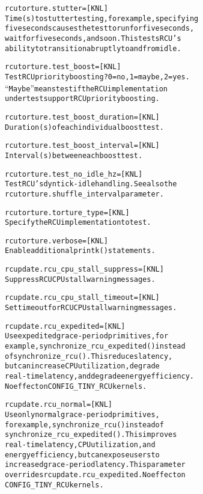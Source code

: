 \documentclass[a4paper,8pt,english]{sphinxmanual}
\begin{document}
\begin{alltt}
        rcutorture.stutter= {[}KNL{]}
                        Time (s) to stutter testing, for example, specifying
                        five seconds causes the test to run for five seconds,
                        wait for five seconds, and so on.  This tests RCU's
                        ability to transition abruptly to and from idle.

        rcutorture.test\_boost= {[}KNL{]}
                        Test RCU priority boosting?  0=no, 1=maybe, 2=yes.
                        ``Maybe'' means test if the RCU implementation
                        under test support RCU priority boosting.

        rcutorture.test\_boost\_duration= {[}KNL{]}
                        Duration (s) of each individual boost test.

        rcutorture.test\_boost\_interval= {[}KNL{]}
                        Interval (s) between each boost test.

        rcutorture.test\_no\_idle\_hz= {[}KNL{]}
                        Test RCU's dyntick-idle handling.  See also the
                        rcutorture.shuffle\_interval parameter.

        rcutorture.torture\_type= {[}KNL{]}
                        Specify the RCU implementation to test.

        rcutorture.verbose= {[}KNL{]}
                        Enable additional printk() statements.

        rcupdate.rcu\_cpu\_stall\_suppress= {[}KNL{]}
                        Suppress RCU CPU stall warning messages.

        rcupdate.rcu\_cpu\_stall\_timeout= {[}KNL{]}
                        Set timeout for RCU CPU stall warning messages.

        rcupdate.rcu\_expedited= {[}KNL{]}
                        Use expedited grace-period primitives, for
                        example, synchronize\_rcu\_expedited() instead
                        of synchronize\_rcu().  This reduces latency,
                        but can increase CPU utilization, degrade
                        real-time latency, and degrade energy efficiency.
                        No effect on CONFIG\_TINY\_RCU kernels.

        rcupdate.rcu\_normal= {[}KNL{]}
                        Use only normal grace-period primitives,
                        for example, synchronize\_rcu() instead of
                        synchronize\_rcu\_expedited().  This improves
                        real-time latency, CPU utilization, and
                        energy efficiency, but can expose users to
                        increased grace-period latency.  This parameter
                        overrides rcupdate.rcu\_expedited.  No effect on
                        CONFIG\_TINY\_RCU kernels.


\end{alltt}
\end{document}

